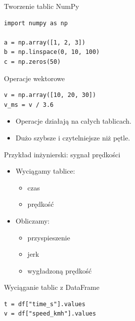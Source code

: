 \documentclass[aspectratio=169]{beamer}
\begin{document}
\begin{frame}[fragile]{Tworzenie tablic NumPy}
\begin{verbatim}
import numpy as np

a = np.array([1, 2, 3])
b = np.linspace(0, 10, 100)
c = np.zeros(50)
\end{verbatim}
\end{frame}

\begin{frame}[fragile]{Operacje wektorowe}
\begin{verbatim}
v = np.array([10, 20, 30])
v_ms = v / 3.6
\end{verbatim}

\begin{itemize}
  \item Operacje działają na całych tablicach.
  \item Dużo szybsze i czytelniejsze niż pętle.
\end{itemize}
\end{frame}

\begin{frame}{Przykład inżynierski: sygnał prędkości}
  \begin{itemize}
    \item Wyciągamy tablice:
      \begin{itemize}
        \item czas
        \item prędkość
      \end{itemize}
    \item Obliczamy:
      \begin{itemize}
        \item przyspieszenie
        \item jerk
        \item wygładzoną prędkość
      \end{itemize}
  \end{itemize}
\end{frame}

\begin{frame}[fragile]{Wyciąganie tablic z DataFrame}
\begin{verbatim}
t = df["time_s"].values
v = df["speed_kmh"].values
\end{verbatim}
\end{frame}
\end{document}
